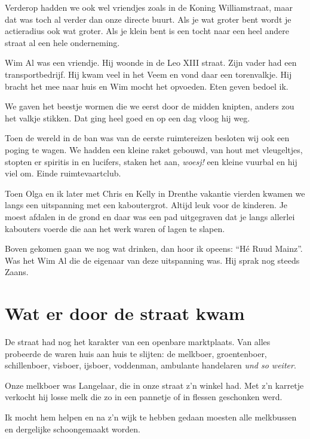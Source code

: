 \documentclass[10pt,twoside, openright]{memoir}
\begin{document}
Verderop hadden we ook wel vriendjes zoals in de Koning Williamstraat, maar dat was toch al verder dan onze directe buurt. Als je wat groter bent wordt je actieradius ook wat groter. Als je klein bent is een tocht naar een heel andere straat al een hele onderneming.

Wim Al was een vriendje. Hij woonde in de Leo XIII straat. Zijn vader had een transportbedrijf. Hij kwam veel in het Veem en vond daar een torenvalkje. Hij bracht het mee naar huis en Wim mocht het opvoeden. Eten geven bedoel ik. 

We gaven het beestje wormen die we eerst door de midden knipten, anders zou het valkje stikken. Dat ging heel goed en op een dag vloog hij weg.

Toen de wereld in de ban was van de eerste ruimtereizen besloten wij ook een poging te wagen. We hadden een kleine raket gebouwd, van hout met vleugeltjes, stopten er spiritis in en lucifers, staken het aan, \emph{woesj!} een kleine vuurbal en hij viel om. Einde ruimtevaartclub.

Toen Olga en ik later met Chris en Kelly in Drenthe vakantie vierden kwamen we langs een uitspanning met een kaboutergrot. Altijd leuk voor de kinderen. Je moest afdalen in de grond en daar was een pad uitgegraven dat je langs allerlei kabouters voerde die aan het werk waren of lagen te slapen. 

Boven gekomen gaan we nog wat drinken, dan hoor ik opeens: ``Hé Ruud Mainz''. Was het Wim Al die de eigenaar van deze uitspanning was. Hij sprak nog steeds Zaans.

\section{Wat er door de straat kwam} %
\label{cha:straat}

De straat had nog het karakter van een openbare marktplaats. Van alles probeerde de waren huis aan huis te slijten: de melkboer, groentenboer, schillenboer, visboer, ijsboer, voddenman, ambulante handelaren \emph{und so weiter}. 

Onze melkboer was Langelaar, die in onze straat z’n winkel had. Met z’n karretje verkocht hij losse melk die zo in een pannetje of in flessen geschonken werd. 

Ik mocht hem helpen en na z’n wijk te hebben gedaan moesten alle melkbussen en dergelijke schoongemaakt worden. 
\end{document}
